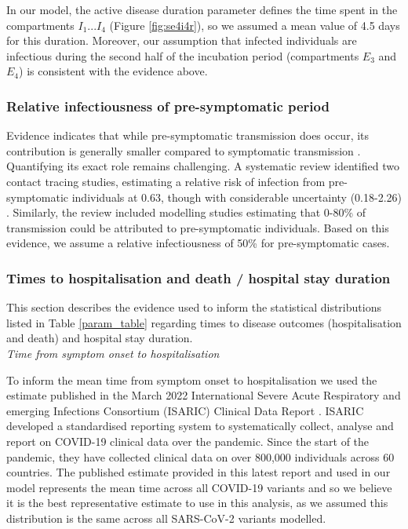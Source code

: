 In our model, the active disease duration parameter defines the time spent in the compartments $I_1...I_4$ (Figure \ref{fig:se4i4r}), 
so we assumed a mean value of 4.5 days for this duration. Moreover, our assumption that infected individuals are infectious during 
the second half of the incubation period (compartments $E_3$ and $E_4$) is consistent with the evidence above. 


\subsubsection{Relative infectiousness of pre-symptomatic period}
Evidence indicates that while pre-symptomatic transmission does occur, its contribution is generally 
smaller compared to symptomatic transmission \cite{gao2021}. Quantifying its exact role remains 
challenging. A systematic review identified two contact tracing studies, estimating a relative risk 
of infection from pre-symptomatic individuals at 0.63, though with considerable uncertainty (0.18-2.26) 
\cite{gao2021}. Similarly, the review included modelling studies estimating that 0-80\% of 
transmission could be attributed to pre-symptomatic individuals. 
Based on this evidence, we assume a relative infectiousness of 50\% for pre-symptomatic cases.

\subsubsection{Times to hospitalisation and death / hospital stay duration}
This section describes the evidence used to inform the statistical distributions listed in Table \ref{param_table}
regarding times to disease outcomes (hospitalisation and death) and hospital stay duration.\\

\textit{Time from symptom onset to hospitalisation}

To inform the mean time from symptom onset to hospitalisation we used the estimate published in the March 2022 International Severe Acute Respiratory 
and emerging Infections Consortium (ISARIC) Clinical Data Report \cite{isaric2022}. ISARIC developed a standardised reporting system to systematically 
collect, analyse and report on COVID-19 clinical data over the pandemic. Since the start of the pandemic, they have collected clinical data on over 
800,000 individuals across 60 countries. The published estimate provided in this latest report and used in our model represents the mean time 
across all COVID-19 variants and so we believe it is the best representative estimate to use in this analysis, as we assumed this distribution is the 
same across all SARS-CoV-2 variants modelled.\\

